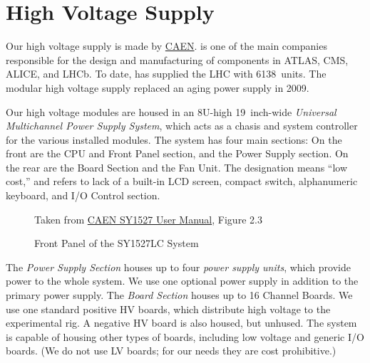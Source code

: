 
\chapter{High Voltage Supply}
\label{chap:eq_high_voltage}

Our high voltage supply is made by \href{http://www.caen.it/}{CAEN}.   is one of the main companies responsible for the design and manufacturing of components in ATLAS, CMS, ALICE, and LHCb.  To date,  has supplied the LHC with 6138~units.  The modular  high voltage supply replaced an aging power supply in 2009.  %

Our high voltage modules are housed in an 8U-high 19~inch-wide  \textit{Universal Multichannel Power Supply System}, which acts as a chasis and system controller for the various installed modules.  The  system has four main sections:  On the front are the CPU and Front Panel section, and the Power Supply section.  On the rear are the Board Section and the Fan Unit.  The  designation means ``low cost,'' and refers to lack of a built-in LCD screen, compact switch, alphanumeric keyboard, and I/O Control section.  

\begin{figure}[htbp]
  \centering
  {
    \tiny Taken from \href{Manuals/CAEN sy1527usermanual_rev15}{CAEN SY1527 User Manual}, Figure 2.3
  }
  \caption{Front Panel of the SY1527LC System}
  \label{fig:eq_high_voltage:chasis_front}
\end{figure}

The \textit{Power Supply Section} houses up to four \textit{power supply units}, which provide power to the whole system.  We use one optional power supply in addition to the primary power supply.  The \textit{Board Section} houses up to 16 Channel Boards.  We use one standard positive HV boards, which distribute high voltage to the experimental rig.  A negative HV board is also housed, but unhused.  The system is capable of housing other types of boards, including low voltage and generic I/O boards.    (We do not use  LV boards; for our needs they are cost prohibitive.)

